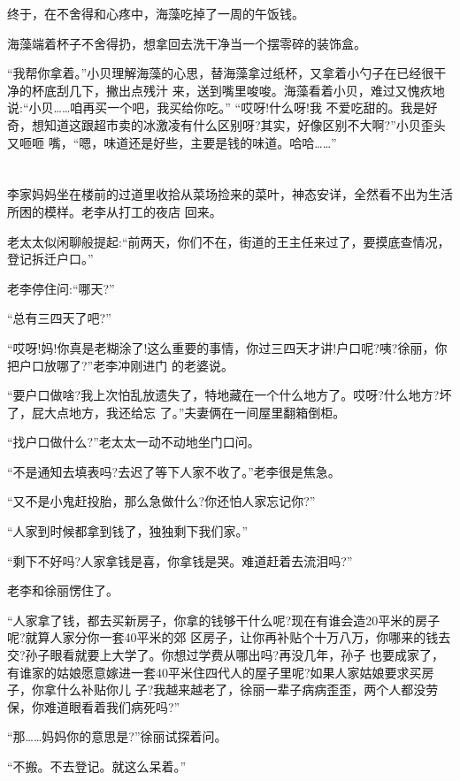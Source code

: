 \documentclass[11pt,a4paper,onecolumn]{article}
\begin{document}
终于，在不舍得和心疼中，海藻吃掉了一周的午饭钱。

海藻端着杯子不舍得扔，想拿回去洗干净当一个摆零碎的装饰盒。

``我帮你拿着。''小贝理解海藻的心思，替海藻拿过纸杯，又拿着小勺子在已经很干净的杯底刮几下，撇出点残汁
来，送到嘴里唆唆。海藻看着小贝，难过又愧疚地说:``小贝……咱再买一个吧，我买给你吃。'' ``哎呀!什么呀!我
不爱吃甜的。我是好奇，想知道这跟超市卖的冰激凌有什么区别呀?其实，好像区别不大啊?''小贝歪头又咂咂
嘴，``嗯，味道还是好些，主要是钱的味道。哈哈……''

\section[\thesection]{}

李家妈妈坐在楼前的过道里收拾从菜场捡来的菜叶，神态安详，全然看不出为生活所困的模样。老李从打工的夜店
回来。

老太太似闲聊般提起:``前两天，你们不在，街道的王主任来过了，要摸底查情况，登记拆迁户口。''

老李停住问:``哪天?''

``总有三四天了吧?''

``哎呀!妈!你真是老糊涂了!这么重要的事情，你过三四天才讲!户口呢?咦?徐丽，你把户口放哪了?''老李冲刚进门
的老婆说。

``要户口做啥?我上次怕乱放遗失了，特地藏在一个什么地方了。哎呀?什么地方?坏了，屁大点地方，我还给忘
了。''夫妻俩在一间屋里翻箱倒柜。

``找户口做什么?''老太太一动不动地坐门口问。

``不是通知去填表吗?去迟了等下人家不收了。''老李很是焦急。

``又不是小鬼赶投胎，那么急做什么?你还怕人家忘记你?''

``人家到时候都拿到钱了，独独剩下我们家。''

``剩下不好吗?人家拿钱是喜，你拿钱是哭。难道赶着去流泪吗?''

老李和徐丽愣住了。

``人家拿了钱，都去买新房子，你拿的钱够干什么呢?现在有谁会造20平米的房子呢?就算人家分你一套40平米的郊
区房子，让你再补贴个十万八万，你哪来的钱去交?孙子眼看就要上大学了。你想过学费从哪出吗?再没几年，孙子
也要成家了，有谁家的姑娘愿意嫁进一套40平米住四代人的屋子里呢?如果人家姑娘要求买房子，你拿什么补贴你儿
子?我越来越老了，徐丽一辈子病病歪歪，两个人都没劳保，你难道眼看着我们病死吗?''

``那……妈妈你的意思是?''徐丽试探着问。

``不搬。不去登记。就这么呆着。''
\end{document}
